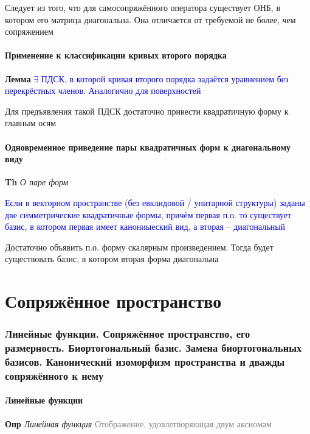 \documentclass[a4paper, 14pt]{article}
\begin{document}
    Следует из того, что для самосопряжённого оператора существует ОНБ, в котором его матрица диагональна.
    Она отличается от требуемой не более, чем сопряжением

    \subsection{Применение к классификации кривых второго порядка}

    \textbf{Лемма} \textcolor{blue}{$\exists$ ПДСК, в которой кривая второго порядка задаётся уравнением без
    перекрёстных членов. Аналогично для поверхностей}

    Для предъявления такой ПДСК достаточно привести квадратичную форму к главным осям

    \subsection{Одновременное приведение пары квадратичных форм к диагональному виду}

    \textbf{Th} \textit{О паре форм}

    \textcolor{blue}{Если в векторном пространстве (без евклидовой / унитарной структуры) заданы две симметрические
    квадратичные формы, причём первая п.о. то существует базис, в котором первая имеет канониыеский вид, а вторая --
    диагональный}

    Достаточно объявить п.о. форму скалярным произведением.
    Тогда будет существовать базис, в котором вторая форма диагональна

     \part*{Сопряжённое пространство}

    \section{Линейные функции.
    Сопряжённое пространство, его размерность.
    Биортогональный базис.
    Замена биортогональных базисов.
    Канонический изоморфизм пространства и дважды сопряжённого к нему}

    \subsection{Линейные функции}

    \textbf{Опр} \textit{Линейная функция} \textcolor{gray}{Отображение, удовлетворяющая двум аксиомам}
\end{document}
